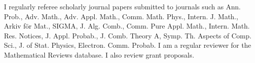 \documentclass[letterpaper,11pt]{article}
\begin{document}





\medskip

I regularly referee scholarly journal papers submitted to journals such as
Ann. Prob., Adv. Math., Adv. Appl. Math., Comm. Math. Phys., Intern. J. Math.,
Arkiv f\"or Mat., SIGMA, J. Alg. Comb., Comm. Pure Appl. Math., Intern. Math.
Res. Notices, J. Appl. Probab., J. Comb. Theory A, Symp. Th. Aspects of Comp.
Sci., J. of Stat. Physics, Electron. Comm. Probab. I am a regular
reviewer for the Mathematical Reviews database. 
I also review grant proposals.


\end{document}
